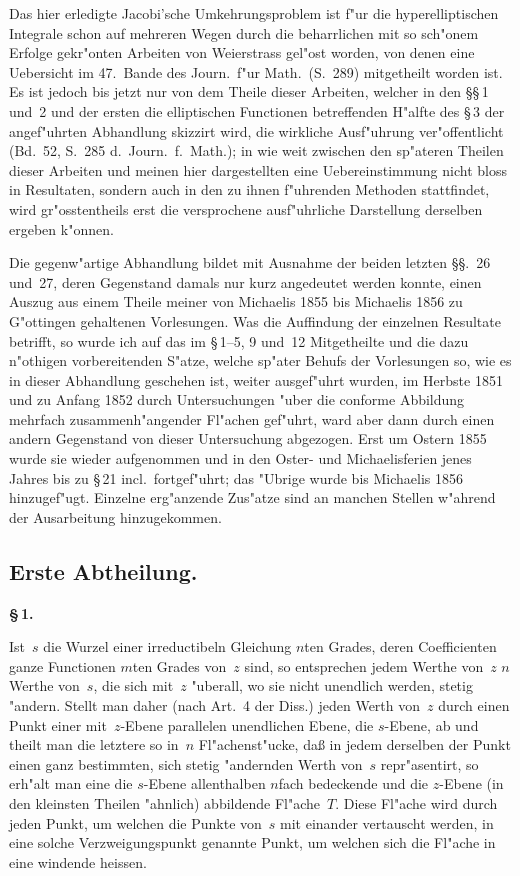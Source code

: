 \documentclass[12pt,a4paper]{article}
\begin{document}
Das hier erledigte Jacobi'sche Umkehrungsproblem ist f"ur die
hyperelliptischen Integrale schon auf mehreren Wegen durch die beharrlichen
mit so sch"onem Erfolge gekr"onten Arbeiten von Weierstrass gel"ost worden,
von denen eine Uebersicht im 47.\ Bande des Journ.\ f"ur Math.\ (S.~289)
mitgetheilt worden ist. Es ist jedoch bis jetzt nur von dem Theile dieser
Arbeiten, welcher in den \S\S\,1 und~2 und der ersten die elliptischen
Functionen betreffenden H"alfte des \S\,3 der angef"uhrten Abhandlung
skizzirt wird, die wirkliche Ausf"uhrung ver"offentlicht (Bd.~52, S.~285
d.\ Journ.\ f.\ Math.); in wie weit zwischen den sp"ateren Theilen dieser
Arbeiten und meinen hier dargestellten eine Uebereinstimmung nicht bloss
in Resultaten, sondern auch in den zu ihnen f"uhrenden Methoden stattfindet,
wird gr"osstentheils erst die versprochene ausf"uhrliche Darstellung derselben
ergeben k"onnen.

Die gegenw"artige Abhandlung bildet mit Ausnahme der beiden letzten
\S\S.\ 26 und~27, deren Gegenstand damals nur kurz angedeutet werden
konnte, einen Auszug aus einem Theile meiner von Michaelis 1855 bis
Michaelis 1856 zu G"ottingen gehaltenen Vorlesungen. Was die Auffindung
der einzelnen Resultate betrifft, so wurde ich auf das im \S\,1--5, 9 und~12
Mitgetheilte und die dazu n"othigen vorbereitenden S"atze, welche sp"ater
Behufs der Vorlesungen so, wie es in dieser Abhandlung geschehen ist,
weiter ausgef"uhrt wurden, im Herbste 1851 und zu Anfang 1852 durch
Untersuchungen "uber die conforme Abbildung mehrfach zusammenh"angender
Fl"achen gef"uhrt, ward aber dann durch einen andern Gegenstand von dieser
Untersuchung abgezogen. Erst um Ostern 1855 wurde sie wieder aufgenommen
und in den Oster- und Michaelisferien jenes Jahres bis zu \S\,21 incl.\ fortgef"uhrt; das "Ubrige wurde bis Michaelis 1856 hinzugef"ugt. Einzelne
erg"anzende Zus"atze sind an manchen Stellen w"ahrend der Ausarbeitung
hinzugekommen.

\newpage
\subsection*{Erste Abtheilung.}

\medskip
\textbf{\S\,1.}

Ist~$s$ die Wurzel einer irreductibeln Gleichung $n$ten Grades, deren
Coefficienten ganze Functionen $m$ten Grades von~$z$ sind, so entsprechen
jedem Werthe von~$z$ $n$ Werthe von~$s$, die sich mit~$z$ "uberall, wo sie
nicht unendlich werden, stetig "andern. Stellt man daher (nach Art.\ 4
der Diss.) jeden Werth von~$z$ durch einen Punkt einer mit~$z$-Ebene
parallelen unendlichen Ebene, die $s$-Ebene, ab und theilt man die letztere
so in~$n$ Fl"achenst"ucke, da\ss{} in jedem derselben der Punkt einen ganz
bestimmten, sich stetig "andernden Werth von~$s$ repr"asentirt, so erh"alt
man eine die $s$-Ebene allenthalben $n$fach bedeckende und die $z$-Ebene
(in den kleinsten Theilen "ahnlich) abbildende Fl"ache~$T$. Diese Fl"ache
wird durch jeden Punkt, um welchen die Punkte von~$s$ mit einander
vertauscht werden, in eine solche Verzweigungspunkt genannte Punkt,
um welchen sich die Fl"ache in eine windende heissen.
\end{document}
